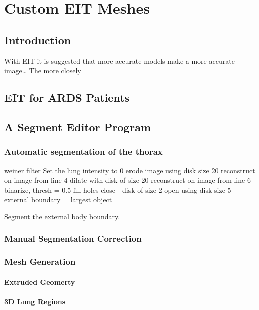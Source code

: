 \chapter{Custom EIT Meshes}

\section{Introduction}

With EIT it is suggested that more accurate models make a more accurate image\dots
The more closely 

\section{EIT for ARDS Patients}

\section{A Segment Editor Program}

\subsection{Automatic segmentation of the thorax}
\begin{algorithm}[H]
	\SetAlgoLined
		weiner filter\;
		Set the lung intensity to 0\;
		erode image using disk size 20\;
		reconstruct on image from line 4\;
		dilate with disk of size 20\;
		reconstruct on image from line 6\;
		binarize, thresh = 0.5\;
		fill holes\;
		close - disk of size 2\;
		open using disk size 5\;
		external boundary = largest object\;
	\caption{Segment the external body boundary.}
\end{algorithm}

\subsection{Manual Segmentation Correction}

\subsection{Mesh Generation}
\subsubsection{Extruded Geomerty}
\subsubsection{3D Lung Regions}


